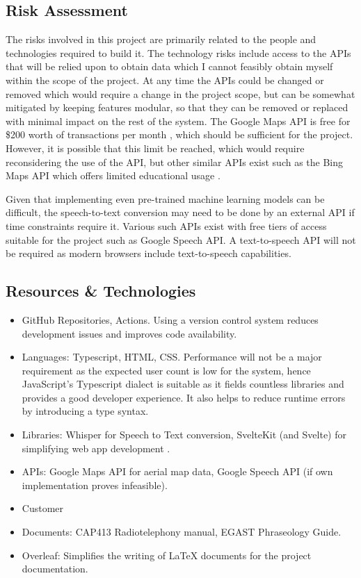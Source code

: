 \subsection{Risk Assessment}
The risks involved in this project are primarily related to the people and technologies required to build it.
The technology risks include access to the APIs that will be relied upon to obtain data which I cannot feasibly obtain myself within the scope of the project.
At any time the APIs could be changed or removed which would require a change in the project scope, but can be somewhat mitigated by keeping features modular, so that they can be removed or replaced with minimal impact on the rest of the system.
The Google Maps API is free for \$200 worth of transactions per month \cite{GoogleMapsLicensing}, which should be sufficient for the project. However, it is possible that this limit be reached, which would require reconsidering the use of the API, but other similar APIs exist such as the Bing Maps API which offers limited educational usage \cite{BingMapsLicensing}.

Given that implementing even pre-trained machine learning models can be difficult, the speech-to-text conversion may need to be done by an external API if time constraints require it. Various such APIs exist with free tiers of access suitable for the project such as Google Speech API. A text-to-speech API will not be required as modern browsers include text-to-speech capabilities.

\subsection{Resources \& Technologies}
\label{resourcestechnologies}
\begin{itemize}
    \item GitHub Repositories, Actions. Using a version control system reduces development issues and improves code availability.
    \item Languages: Typescript, HTML, CSS. Performance will not be a major requirement as the expected user count is low for the system, hence JavaScript's Typescript dialect is suitable as it fields countless libraries and provides a good developer experience. It also helps to reduce runtime errors by introducing a type syntax.
    \item Libraries: Whisper for Speech to Text conversion, SvelteKit (and Svelte) for simplifying web app development \cite{SvelteKit}\cite{Svelte}.
    \item APIs: Google Maps API for aerial map data, Google Speech API (if own implementation proves infeasible).
    \item Customer
    \item Documents: CAP413 Radiotelephony manual, EGAST Phraseology Guide.
    \item Overleaf: Simplifies the writing of LaTeX documents for the project documentation.
\end{itemize}

